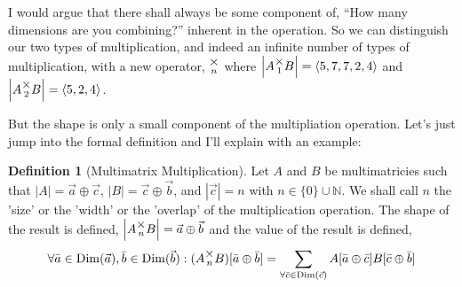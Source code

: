 \documentclass[12pt]{book}
\theoremstyle{plain}
\theoremstyle{definition}
\newtheorem{definition}{Definition}[chapter]
\theoremstyle{ppart}
\theoremstyle{case}
\theoremstyle{solution}
\DeclareMathOperator{\Dim}{Dim}
\newcommand{\mmult}[1]{\text{\raisebox{1ex}{$\underset{#1}{\times}$}}}
\newcommand{\shape}[1]{\left|#1\right|}
\begin{document}
I would argue that there shall always be some component of, 
``How many dimensions are you combining?'' inherent
in the operation. So we can distinguish our two types of multiplication, and indeed
an infinite number of types of multiplication, with a new operator, $\mmult{n}$ where
$\shape{A \mmult{1} B} = \left<5, 7, 7, 2, 4\right>$ and 
$\shape{A \mmult{2} B} = \left<5, 2, 4\right>$.

But the shape is only a small component of the multipliation  operation. Let's
just jump into the formal definition and I'll explain with an example:

\begin{definition}[Multimatrix Multiplication]
\label{mm_mult}
Let $A$ and $B$ be multimatricies such that $\shape{A} = \vec{a} \oplus \vec{c}$,
$\shape{B} = \vec{c} \oplus \vec{b}$, and $\shape{\vec{c}} = n$ with
$n \in \{0\} \cup \mathbb{N}$. We shall call $n$ the 'size' or the 'width'
or the 'overlap' of the multiplication operation.
The shape of the result is defined, $\shape{A \mmult{n} B} = \vec{a} \oplus \vec{b}$
and the value of the result is defined,
\[
\forall \bar{a} \in \Dim(\vec{a}), \bar{b} \in \Dim(\vec{b}):
(A \mmult{n}  B)[\bar{a} \oplus \bar{b}] =
\sum_{\forall \bar{c} \in \Dim(\vec{c})}
  A[\bar{a} \oplus \bar{c}] B[\bar{c} \oplus \bar{b}]
\]
\end{definition}
\end{document}
